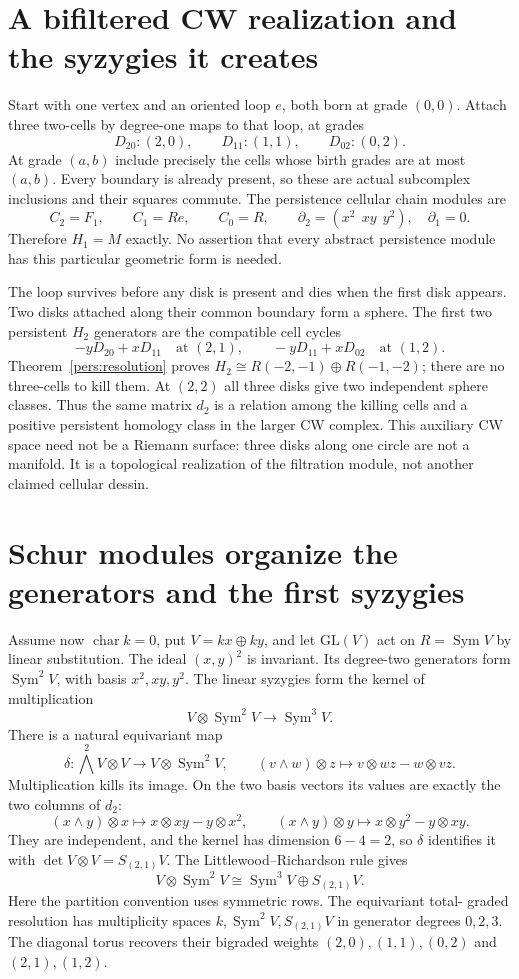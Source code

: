 \section{A bifiltered CW realization and the syzygies it creates}
Start with one vertex and an oriented loop $e$, both born at grade $(0,0)$.
Attach three two-cells by degree-one maps to that loop, at grades
\[
 D_{20}:(2,0),\qquad D_{11}:(1,1),\qquad D_{02}:(0,2).
\]
At grade $(a,b)$ include precisely the cells whose birth grades are at
most $(a,b)$. Every boundary is already present, so these are actual
subcomplex inclusions and their squares commute. The persistence cellular
chain modules are
\[
 C_2=F_1,\qquad C_1=R e,\qquad C_0=R,\qquad
 \partial_2=(x^2\ \ xy\ \ y^2),\quad\partial_1=0.
\]
Therefore $H_1=M$ exactly. No assertion that every abstract persistence
module has this particular geometric form is needed.

The loop survives before any disk is present and dies when the first disk
appears. Two disks attached along their common boundary form a sphere.
The first two persistent $H_2$ generators are the compatible cell cycles
\[
 -yD_{20}+xD_{11}\quad\text{at }(2,1),\qquad
 -yD_{11}+xD_{02}\quad\text{at }(1,2).
\]
Theorem~\ref{pers:resolution} proves
$H_2\cong R(-2,-1)\oplus R(-1,-2)$; there are no three-cells to kill
them. At $(2,2)$ all three disks give two independent sphere classes.
Thus the same matrix $d_2$ is a relation among the killing cells and a
positive persistent homology class in the larger CW complex.
This auxiliary CW space need not be a Riemann surface: three disks along
one circle are not a manifold. It is a topological realization of the
filtration module, not another claimed cellular dessin.

\section{Schur modules organize the generators and the first syzygies}
Assume now $\operatorname{char}k=0$, put $V=kx\oplus ky$, and let
$\mathrm{GL}(V)$ act on $R=\operatorname{Sym}V$ by linear substitution.
The ideal $(x,y)^2$ is invariant. Its degree-two generators form
$\operatorname{Sym}^2V$, with basis $x^2,xy,y^2$.
The linear syzygies form the kernel of multiplication
\[
 V\otimes\operatorname{Sym}^2V\longrightarrow\operatorname{Sym}^3V.
\]
There is a natural equivariant map
\[
 \delta:\bigwedge^2V\otimes V\longrightarrow V\otimes\operatorname{Sym}^2V,
 \qquad (v\wedge w)\otimes z\longmapsto
       v\otimes wz-w\otimes vz.
\]
Multiplication kills its image. On the two basis vectors its values are
exactly the two columns of $d_2$:
\[
 (x\wedge y)\otimes x\mapsto x\otimes xy-y\otimes x^2,
 \qquad
 (x\wedge y)\otimes y\mapsto x\otimes y^2-y\otimes xy.
\]
They are independent, and the kernel has dimension $6-4=2$, so $\delta$
identifies it with $\det V\otimes V=S_{(2,1)}V$. The Littlewood--Richardson
rule gives
\[
 V\otimes\operatorname{Sym}^2V
 \cong\operatorname{Sym}^3V\oplus S_{(2,1)}V.
\]
Here the partition convention uses symmetric rows. The equivariant total-
graded resolution has multiplicity spaces
$k,\operatorname{Sym}^2V,S_{(2,1)}V$ in generator degrees $0,2,3$.
The diagonal torus recovers their bigraded weights
$(2,0),(1,1),(0,2)$ and $(2,1),(1,2)$.

